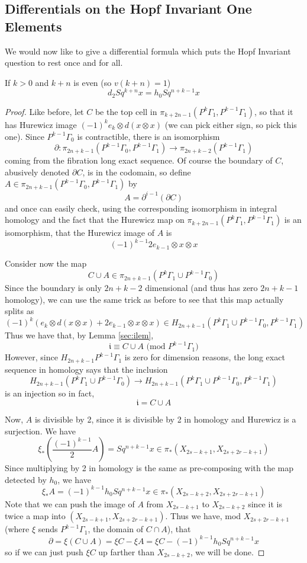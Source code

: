\subsection{Differentials on the Hopf Invariant One Elements}

We would now like to give a differential formula which puts the Hopf Invariant question to rest once and for all.
\begin{Theorem}
  \label{sec:hdiffthm}
  If $k>0$ and $k+n$ is even (so $v(k+n)=1$)
  \[d_{2}Sq^{k+n}x = h_0Sq^{n+k-1}x\]
\end{Theorem}


\begin{proof}
  Like before, let $C$ be the top cell in $\pi_{k+2n-1}(P^k\Gamma_1,P^{k-1}\Gamma_1)$, so that it has Hurewicz image $(-1)^ke_k\otimes d(x\otimes x)$ (we can pick either sign, so pick this one).  
  Since $P^{k-1}\Gamma_0$ is contractible, there is an isomorphism 
  \[\partial : \pi_{2n+k-1}(P^{k-1}\Gamma_0,P^{k-1}\Gamma_1)\to \pi_{2n+k-2}(P^{k-1}\Gamma_1)\]
  coming from the fibration long exact sequence.  Of course the boundary of $C$, abusively denoted $\partial C$, is in the codomain, so define $A\in \pi_{2n+k-1}(P^{k-1}\Gamma_0,P^{k-1}\Gamma_1)$ by 
  \[A=\partial^{i-1}(\partial C)\]
  and once can easily check, using the corresponding isomorphism in integral homology and the fact that the Hurewicz map on $\pi_{k+2n-1}(P^k\Gamma_1,P^{k-1}\Gamma_1)$ is an isomorphism, that the Hurewicz image of $A$ is
  \[(-1)^{k-1}2e_{k-1}\otimes x\otimes x\]
  
  Consider now the map 
  \[C\cup A \in \pi_{2n+k-1}(P^k\Gamma_1\cup P^{k-1}\Gamma_0)\]
  Since the boundary is only $2n+k-2$ dimensional (and thus has zero $2n+k-1$ homology),
  we can use the same trick as before to see that this map actually splits as 
  \[(-1)^k(e_k\otimes d(x\otimes x) + 2e_{k-1}\otimes x \otimes x)\in H_{2n+k-1}(P^k\Gamma_1\cup P^{k-1}\Gamma_0,P^{k-1}\Gamma_1)\]
  Thus we have that, by Lemma \ref{sec:ilem}, 
  \[\mathfrak{i} \equiv C\cup A \mbox{ (mod $P^{k-1}\Gamma_1$)}\]
  However, since $H_{2n+k-1}P^{k-1}\Gamma_1$ is zero for dimension reasons, the long exact sequence in homology says that the inclusion
  \[H_{2n+k-1}(P^k\Gamma_1\cup P^{k-1}\Gamma_0)\to H_{2n+k-1}(P^k\Gamma_1\cup P^{k-1}\Gamma_0,P^{k-1}\Gamma_1)\]
  is an injection so in fact, 
  \[\mathfrak{i} = C\cup A\]
  
  Now, $A$ is divisible by 2, since it is divisible by 2 in homology and Hurewicz is a surjection.
  We have
  \[\xi_*\left(\frac{(-1)^{k-1}}{2}A\right) = Sq^{n+k-1}x \in \pi_*(X_{2s-k+1},X_{2s+2r-k+1})\]
  Since multiplying by 2 in homology is the same as pre-composing with the map detected by $h_0$, we have
  \[\xi_*A = (-1)^{k-1}h_0Sq^{n+k-1}x \in \pi_*(X_{2s-k+2},X_{2s+2r-k+1})\]
  Note that we can push the image of $A$ from $X_{2s-k+1}$ to $X_{2s-k+2}$ since it is twice a map into $(X_{2s-k+1},X_{2s+2r-k+1})$.
  Thus we have, mod $X_{2s+2r-k+1}$ (where $\xi$ sends $P^{k-1}\Gamma_1$, the domain of $C\cap A$), that
  \[\partial = \xi(C\cup A) = \xi C - \xi A = \xi C - (-1)^{k-1}h_0Sq^{n+k-1}x\]
  so if we can just push $\xi C$ up farther than $X_{2s-k+2}$, we will be done.  



\end{proof}
